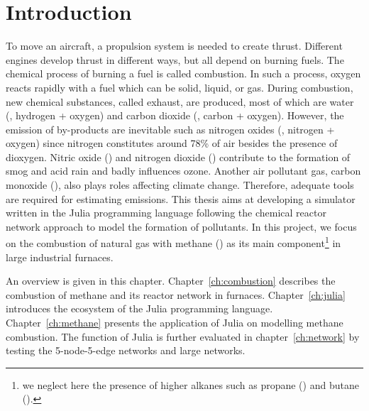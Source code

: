 \chapter{Introduction} 

To move an aircraft, a propulsion system is needed to create thrust. Different engines develop thrust in different ways, but all depend on burning fuels. The chemical process of burning a fuel is called combustion. In such a process, oxygen reacts rapidly with a fuel which can be solid, liquid, or gas. During combustion, new chemical substances, called exhaust, are produced, most of which are water (, hydrogen + oxygen) and carbon dioxide (, carbon + oxygen). However, the emission of by-products are inevitable such as nitrogen oxides (, nitrogen + oxygen) since nitrogen constitutes around 78\% of air besides the presence of dioxygen. Nitric oxide () and nitrogen dioxide () contribute to the formation of smog and acid rain and badly influences ozone. Another air pollutant gas, carbon monoxide (), also plays roles affecting climate change. Therefore, adequate tools are required for estimating emissions. This thesis aims at developing a simulator written in the Julia programming language following the chemical reactor network approach to model the formation of pollutants. In this project, we focus on the combustion of natural gas with methane () as its main component\footnote{we neglect here the presence of higher alkanes such as propane () and butane ().} in large industrial furnaces. 

An overview is given in this chapter. Chapter~\ref{ch:combustion} describes the combustion of methane and its reactor network in furnaces. Chapter~\ref{ch:julia} introduces the ecosystem of the Julia programming language. Chapter~\ref{ch:methane} presents the application of Julia on modelling methane combustion. The function of Julia is further evaluated in chapter~\ref{ch:network} by testing the 5-node-5-edge networks and large networks.